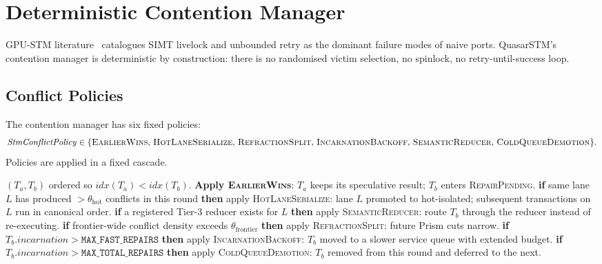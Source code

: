 \section{Deterministic Contention Manager}

\label{sec:contention}

GPU-STM literature~\cite{cederman2010,holey2014} catalogues SIMT
livelock and unbounded retry as the dominant failure modes of
naive ports. QuasarSTM's contention manager is deterministic by
construction: there is no randomised victim selection, no spinlock,
no retry-until-success loop.

\subsection{Conflict Policies}

\begin{definition}
\label{def:policy-set}
The contention manager has six fixed policies:
\[
\mathit{StmConflictPolicy} \in \{
\textsc{EarlierWins},\,
\textsc{HotLaneSerialize},\,
\textsc{RefractionSplit},\,
\textsc{IncarnationBackoff},\,
\textsc{SemanticReducer},\,
\textsc{ColdQueueDemotion}\}.
\]
Policies are applied in a fixed cascade.
\end{definition}

\begin{algorithm}[H]
\caption{Contention manager: dispatch policy for conflict $C$
between $T_a$ and $T_b$}
\label{alg:contention}
\begin{algorithmic}[1]
\State $(T_a, T_b)$ ordered so $\mathit{idx}(T_a) <
       \mathit{idx}(T_b)$.
\State \textbf{Apply \textsc{EarlierWins}}: $T_a$ keeps its
       speculative result; $T_b$ enters \textsc{RepairPending}.
\State \textbf{if} same lane $L$ has produced
       $> \theta_{\mathrm{hot}}$ conflicts in this round \textbf{then}
       apply \textsc{HotLaneSerialize}: lane $L$ promoted to
       hot-isolated; subsequent transactions on $L$ run in canonical
       order.
\State \textbf{if} a registered Tier-3 reducer exists for $L$
       \textbf{then} apply \textsc{SemanticReducer}: route $T_b$
       through the reducer instead of re-executing.
\State \textbf{if} frontier-wide conflict density exceeds
       $\theta_{\mathrm{frontier}}$ \textbf{then} apply
       \textsc{RefractionSplit}: future Prism cuts narrow.
\State \textbf{if} $T_b.\mathit{incarnation} >
       \mathtt{MAX\_FAST\_REPAIRS}$ \textbf{then} apply
       \textsc{IncarnationBackoff}: $T_b$ moved to a slower service
       queue with extended budget.
\State \textbf{if} $T_b.\mathit{incarnation} >
       \mathtt{MAX\_TOTAL\_REPAIRS}$ \textbf{then} apply
       \textsc{ColdQueueDemotion}: $T_b$ removed from this round and
       deferred to the next.
\end{algorithmic}
\end{algorithm}

